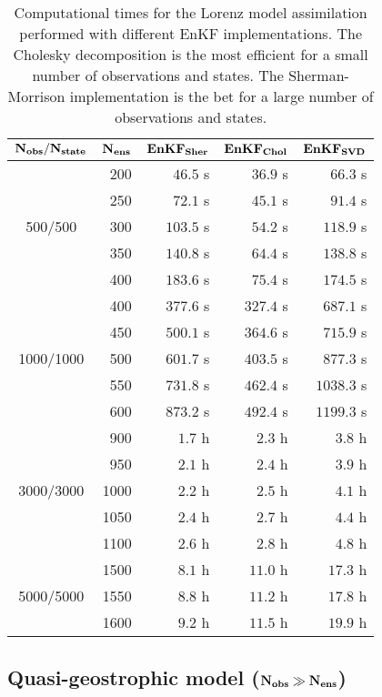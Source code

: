 \documentclass[12pt]{article}
\newcommand{\N}{{\bf N}}
\begin{document}
\begin{table}[H]
\centering
{
\begin{tabular}{|c|r|r|r|r|} \hline
${\bf N_{obs}/ N_{state}}$ & $\bf N_{ens}$ & ${\bf EnKF_{Sher}}$ & ${\bf  EnKF_{Chol}}$ & ${\bf EnKF_{SVD} }$  \\ \hline
\multirow{5}{*}{500/500} & 200 & $46.5$ s & $36.9$ s & $66.3$ s \\ 
&   250 & $72.1$ s & $45.1$ s & $91.4$ s \\ 
&   300 & $103.5$ s & $54.2$ s & $118.9$ s \\ 
&   350 & $140.8$ s & $64.4$ s & $138.8$ s \\ 
&   400 & $183.6$ s & $75.4$ s & $174.5$ s \\ \hline
\multirow{5}{*}{1000/1000} & 400 & $377.6$ s & $327.4$ s & $ 687.1$ s \\ 
&   450 & $500.1$ s & $364.6$ s & $715.9$ s \\ 
&   500 & $601.7$ s & $403.5$ s & $ 877.3$  s \\ 
&   550 & $731.8$ s & $462.4$ s & $1038.3$  s \\ 
&   600 & $873.2$ s & $492.4$ s & $1199.3$ s \\ \hline
\multirow{5}{*}{3000/3000} & 900 & $1.7$ h & $2.3$ h & $3.8$ h  \\ 
&   950 & $2.1$ h & $2.4$ h & $3.9$ h \\ 
&   1000 & $2.2$ h & $2.5$ h & $4.1$ h  \\ 
&   1050 & $2.4$ h & $2.7$ h & $4.4$ h  \\ 
&   1100 & $2.6$ h & $2.8$ h & $4.8$ h \\ \hline
\multirow{3}{*}{5000/5000} & 1500 & $8.1$ h & $11.0$ h & $17.3$ h  \\ 
&   1550 & $8.8$ h & $11.2$ h & $17.8$ h\\ 
&   1600 & $9.2$ h & $11.5$ h & $19.9$ h  \\ \hline
\end{tabular}
}
\caption{Computational times for the Lorenz model assimilation performed with different EnKF implementations. 
The Cholesky decomposition is the most efficient for a small number of observations and states. The
Sherman-Morrison implementation is the bet for a large number of observations and states. 
}
\label{Tab:Lorenz-Results-TIME}
\end{table}

\subsection{Quasi-geostrophic model ($\bf N_{obs} \gg \N_{ens}$)}
\end{document}
